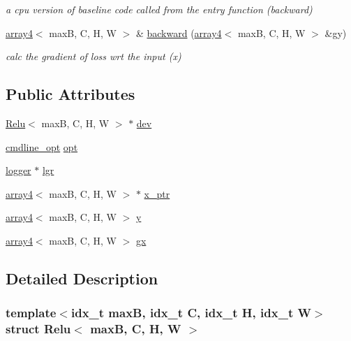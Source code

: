\begin{DoxyCompactItemize}
\begin{DoxyCompactList}\small\item\em a cpu version of baseline code called from the entry function (backward) \end{DoxyCompactList}\item 
\hyperlink{structarray4}{array4}$<$ maxB, C, H, W $>$ \& \hyperlink{structRelu_af9d3182c5103542c1c9796edc449847c}{backward} (\hyperlink{structarray4}{array4}$<$ maxB, C, H, W $>$ \&gy)
\begin{DoxyCompactList}\small\item\em calc the gradient of loss wrt the input (x) \end{DoxyCompactList}\end{DoxyCompactItemize}
\subsection*{Public Attributes}
\begin{DoxyCompactItemize}
\item 
\hyperlink{structRelu}{Relu}$<$ maxB, C, H, W $>$ $\ast$ \hyperlink{structRelu_a1e1271caca013c95ece064b47196d100}{dev}
\item 
\hyperlink{structcmdline__opt}{cmdline\+\_\+opt} \hyperlink{structRelu_a63f877be5c3cf3b8c89b57dbf2da0e68}{opt}
\item 
\hyperlink{structlogger}{logger} $\ast$ \hyperlink{structRelu_af0064c033b32a241427e76c25b2eee41}{lgr}
\item 
\hyperlink{structarray4}{array4}$<$ maxB, C, H, W $>$ $\ast$ \hyperlink{structRelu_a51ae894a609b5de1e41e8fd30ff5575c}{x\+\_\+ptr}
\item 
\hyperlink{structarray4}{array4}$<$ maxB, C, H, W $>$ \hyperlink{structRelu_a30148be5eabe65c95a37c7cd0525c08a}{y}
\item 
\hyperlink{structarray4}{array4}$<$ maxB, C, H, W $>$ \hyperlink{structRelu_a0e864208d70a5d7976a71c87a54c7edf}{gx}
\end{DoxyCompactItemize}


\subsection{Detailed Description}
\subsubsection*{template$<$idx\+\_\+t maxB, idx\+\_\+t C, idx\+\_\+t H, idx\+\_\+t W$>$\newline
struct Relu$<$ max\+B, C, H, W $>$}

